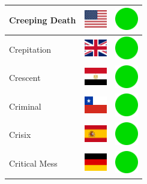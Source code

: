 \documentclass[12pt, a4paper, twoside]{report}
\begin{document}
\begin{center}
\begin{longtable}{|p{5cm}|p{2cm}|p{2cm}|}
Creeping Death & \includegraphics[width=1cm]{4x3/us} & \includegraphics[width=1cm]{likes/y} \\ \hline
Crepitation & \includegraphics[width=1cm]{4x3/gb} & \includegraphics[width=1cm]{likes/y} \\ \hline
Crescent & \includegraphics[width=1cm]{4x3/eg} & \includegraphics[width=1cm]{likes/y} \\ \hline
Criminal & \includegraphics[width=1cm]{4x3/cl} & \includegraphics[width=1cm]{likes/y} \\ \hline
Crisix & \includegraphics[width=1cm]{4x3/es} & \includegraphics[width=1cm]{likes/y} \\ \hline
Critical Mess & \includegraphics[width=1cm]{4x3/de} & \includegraphics[width=1cm]{likes/y} \\ \hline

\end{longtable}
\end{center}
\end{document}
